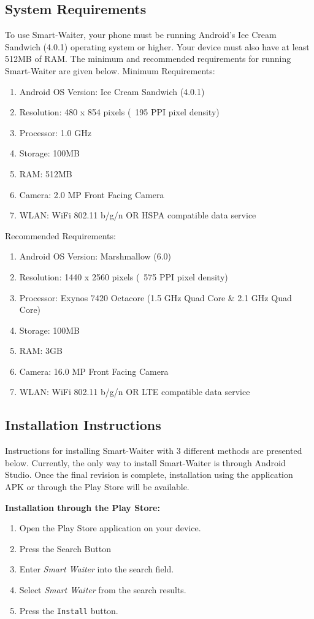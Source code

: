 \documentclass[12pt, titlepage]{article}
\begin{document}
\subsection{System Requirements}
To use Smart-Waiter, your phone must be running Android's Ice Cream Sandwich (4.0.1) operating system or higher. Your device must also have at least 512MB of RAM. 
The minimum and recommended requirements for running Smart-Waiter are given below.
Minimum Requirements:
\begin{enumerate}
	\item Android OS Version: Ice Cream Sandwich (4.0.1)
	\item Resolution: 480 x 854 pixels (~195 PPI pixel density)
	\item Processor: 1.0 GHz
	\item Storage: 100MB
	\item RAM: 512MB
	\item Camera: 2.0 MP Front Facing Camera
	\item WLAN: WiFi 802.11 b/g/n OR HSPA compatible data service
\end{enumerate}

Recommended Requirements:
\begin{enumerate}
\item Android OS Version: Marshmallow (6.0)
	\item Resolution: 1440 x 2560 pixels (~575 PPI pixel density)
	\item Processor: Exynos 7420 Octacore (1.5 GHz Quad Core \& 2.1 GHz Quad Core)
	\item Storage: 100MB
	\item RAM: 3GB %
	\item Camera: 16.0 MP Front Facing Camera
	\item WLAN: WiFi 802.11 b/g/n OR LTE compatible data service	
\end{enumerate}

\subsection{Installation Instructions}
Instructions for installing Smart-Waiter with 3 different methods are presented below. Currently, the only way to install Smart-Waiter is through Android Studio. Once the final revision is complete, installation using the application APK or through the Play Store will be available.

\textbf{\newline Installation through the Play Store:}
	\begin{enumerate}
		\item Open the Play Store application on your device.
		\item Press the Search Button
		\item Enter \emph{Smart Waiter} into the search field.
		\item Select \emph{Smart Waiter} from the search results.
		\item Press the \texttt{Install} button.		
	\end{enumerate}
\end{document}
